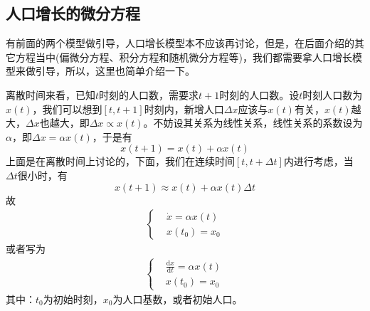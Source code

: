 	\subsection{人口增长的微分方程}
		\par
		有前面的两个模型做引导，人口增长模型本不应该再讨论，但是，在后面介绍的其它方程当中(偏微分方程、积分方程和随机微分方程等)，我们都需要拿人口增长模型来做引导，所以，这里也简单介绍一下。
		\par
		离散时间来看，已知$t$时刻的人口数，需要求$t+1$时刻的人口数。设$t$时刻人口数为$x(t)$，我们可以想到$[t,t+1]$时刻内，新增人口$\Delta x$应该与$x(t)$有关，$x(t)$越大，$\Delta x$也越大，即$\Delta x \propto x(t)$。不妨设其关系为线性关系，线性关系的系数设为$\alpha$，即$\Delta x = \alpha x(t)$，于是有
		\[
			x(t+1)=x(t)+\alpha x(t)
		\]
		上面是在离散时间上讨论的，下面，我们在连续时间$[t,t+\Delta t]$内进行考虑，当$\Delta t$很小时，有
		\[
			x(t+1)\approx x(t)+\alpha x(t)\Delta t
		\]
		故
		\begin{align*}
			 \left\{
				 \begin{aligned}
					 &\dot{x} = \alpha x(t)\\
					 &x(t_0) = x_0
				 \end{aligned}
			 \right.
		\end{align*}
		或者写为
		\begin{align*}
			 \left\{
				 \begin{aligned}
					 &\frac{\mathrm{d}x}{\mathrm{d}t} = \alpha x(t)\\
					 &x(t_0) = x_0
				 \end{aligned}
			 \right.
		\end{align*}
		其中：$t_0$为初始时刻，$x_0$为人口基数，或者初始人口。

